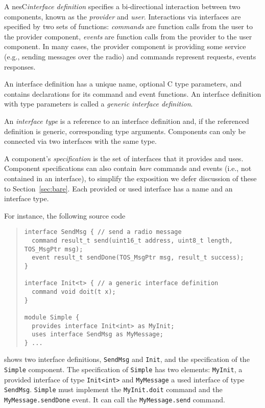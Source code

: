 \documentclass[11pt,letterpaper]{article}
\newcommand{\code}[1]{{\tt #1}}
\newcommand{\nesc}{nesC\xspace}
\begin{document}
A \nesc \emph{interface definition} specifies a bi-directional interaction
between two components, known as the \emph{provider} and
\emph{user}. Interactions via interfaces are specified by two sets of
functions: \emph{commands} are function calls from the user to the provider
component, \emph{events} are function calls from the provider to the user
component. In many cases, the provider component is providing some service
(e.g., sending messages over the radio) and commands represent requests,
events responses.

An interface definition has a unique name, optional C type parameters, and
contains declarations for its command and event functions. An interface
definition with type parameters is called a \emph{generic interface
definition}.

An \emph{interface type} is a reference to an interface definition and, if
the referenced definition is generic, corresponding type
arguments. Components can only be connected via two interfaces with the
same type.

A component's \emph{specification} is the set of interfaces that it
provides and uses. Component specifications can also contain \emph{bare}
commands and events (i.e., not contained in an interface), to simplify the
exposition we defer discussion of these to Section~\ref{sec:bare}. Each
provided or used interface has a name and an interface type.

For instance, the following source code
\begin{quote} \begin{verbatim}
interface SendMsg { // send a radio message
  command result_t send(uint16_t address, uint8_t length, TOS_MsgPtr msg);
  event result_t sendDone(TOS_MsgPtr msg, result_t success);
}

interface Init<t> { // a generic interface definition
  command void doit(t x);
}

module Simple {
  provides interface Init<int> as MyInit;
  uses interface SendMsg as MyMessage;
} ...
\end{verbatim} \end{quote}
shows two interface definitions, \code{SendMsg} and \code{Init}, and the
specification of the \code{Simple} component. The specification of
\code{Simple} has two elements: \code{MyInit}, a provided interface of type
\code{Init<int>} and \code{MyMessage} a used interface of type
\code{SendMsg}. \code{Simple} must implement the \code{MyInit.doit} command
and the \code{MyMessage.sendDone} event. It can call the
\code{MyMessage.send} command.
\end{document}
